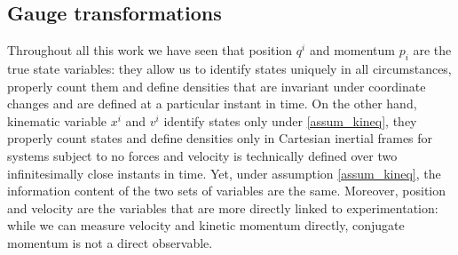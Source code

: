 \subsection{Gauge transformations}

Throughout all this work we have seen that position $q^i$ and momentum $p_i$ are the true state variables: they allow us to identify states uniquely in all circumstances, properly count them and define densities that are invariant under coordinate changes and are defined at a particular instant in time. On the other hand, kinematic variable $x^i$ and $v^i$ identify states only under \ref{assum_kineq}, they properly count states and define densities only in Cartesian inertial frames for systems subject to no forces and velocity is technically defined over two infinitesimally close instants in time. Yet, under assumption \ref{assum_kineq}, the information content of the two sets of variables are the same. Moreover, position and velocity are the variables that are more directly linked to experimentation: while we can measure velocity and kinetic momentum directly, conjugate momentum is not a direct observable.

